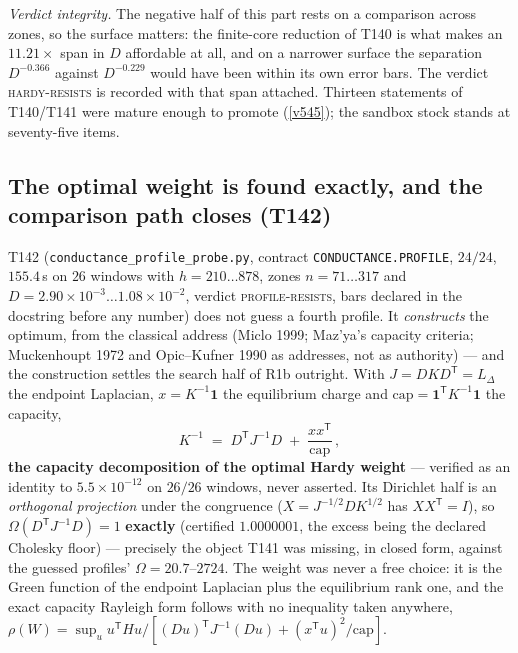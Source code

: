 \documentclass[11pt,a4paper]{article}
\begin{document}
\noindent \emph{Verdict integrity.} The negative half of this part rests on a comparison across
zones, so the surface matters: the finite-core reduction of T140 is what makes an $11.21\times$
span in $D$ affordable at all, and on a narrower surface the separation
$D^{-0.366}$ against $D^{-0.229}$ would have been within its own error bars. The verdict
\textsc{hardy-resists} is recorded with that span attached. Thirteen statements of T140/T141 were
mature enough to promote (\vref{v545}); the sandbox stock stands at seventy-five items.

\subsection{The optimal weight is found exactly, and the comparison path closes (T142)}
T142 (\texttt{conductance\_profile\_probe.py}, contract \texttt{CONDUCTANCE.PROFILE}, $24/24$,
$155.4$\,s on $26$ windows with $h=210\ldots878$, zones $n=71\ldots317$ and
$D=2.90\times10^{-3}\ldots1.08\times10^{-2}$, verdict \textsc{profile-resists}, bars declared in
the docstring before any number) does not guess a fourth profile. It \emph{constructs} the
optimum, from the classical address (Miclo 1999; Maz'ya's capacity criteria; Muckenhoupt 1972 and
Opic--Kufner 1990 as addresses, not as authority) --- and the construction settles the search half
of R1b outright. With $J=DKD^{\mathsf T}=L_\Delta$ the endpoint Laplacian, $x=K^{-1}\mathbf 1$ the
equilibrium charge and $\mathrm{cap}=\mathbf 1^{\mathsf T}K^{-1}\mathbf 1$ the capacity,
\[
K^{-1} \;=\; D^{\mathsf T}J^{-1}D \;+\; \frac{xx^{\mathsf T}}{\mathrm{cap}}\,,
\]
\textbf{the capacity decomposition of the optimal Hardy weight} --- verified as an identity to
$5.5\times10^{-12}$ on $26/26$ windows, never asserted. Its Dirichlet half is an
\emph{orthogonal projection} under the congruence ($X=J^{-1/2}DK^{1/2}$ has
$XX^{\mathsf T}=I$), so $\Omega(D^{\mathsf T}J^{-1}D)=1$ \textbf{exactly} (certified
$1.0000001$, the excess being the declared Cholesky floor) --- precisely the object T141 was
missing, in closed form, against the guessed profiles' $\Omega=20.7$--$2724$. The weight was
never a free choice: it is the Green function of the endpoint Laplacian plus the equilibrium
rank one, and the exact capacity Rayleigh form follows with no inequality taken anywhere,
$\rho(W)=\sup_u u^{\mathsf T}Hu/[(Du)^{\mathsf T}J^{-1}(Du)+(x^{\mathsf T}u)^2/\mathrm{cap}]$.
\end{document}
